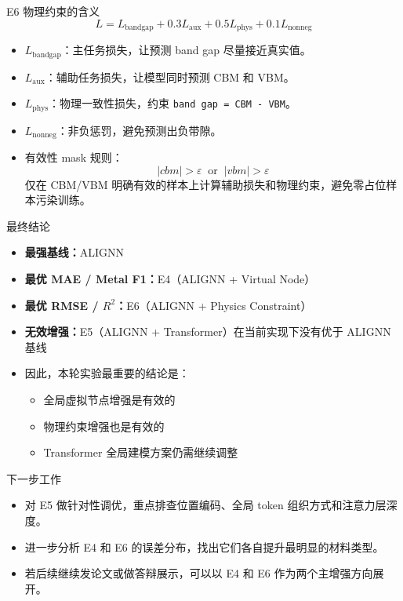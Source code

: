 \documentclass{beamer}
\begin{document}
\begin{frame}{E6 物理约束的含义}
\small
\[
L = L_{\text{bandgap}} + 0.3L_{\text{aux}} + 0.5L_{\text{phys}} + 0.1L_{\text{nonneg}}
\]
\begin{itemize}
  \item $L_{\text{bandgap}}$：主任务损失，让预测 band gap 尽量接近真实值。
  \item $L_{\text{aux}}$：辅助任务损失，让模型同时预测 CBM 和 VBM。
  \item $L_{\text{phys}}$：物理一致性损失，约束 \texttt{band gap = CBM - VBM}。
  \item $L_{\text{nonneg}}$：非负惩罚，避免预测出负带隙。
  \item 有效性 mask 规则：
  \[
  |cbm| > \varepsilon \;\; \text{or} \;\; |vbm| > \varepsilon
  \]
  仅在 CBM/VBM 明确有效的样本上计算辅助损失和物理约束，避免零占位样本污染训练。
\end{itemize}
\end{frame}

\begin{frame}{最终结论}
\begin{itemize}
  \item \textbf{最强基线：}ALIGNN
  \item \textbf{最优 MAE / Metal F1：}E4（ALIGNN + Virtual Node）
  \item \textbf{最优 RMSE / $R^2$：}E6（ALIGNN + Physics Constraint）
  \item \textbf{无效增强：}E5（ALIGNN + Transformer）在当前实现下没有优于 ALIGNN 基线
  \item 因此，本轮实验最重要的结论是：
  \begin{itemize}
    \item 全局虚拟节点增强是有效的
    \item 物理约束增强也是有效的
    \item Transformer 全局建模方案仍需继续调整
  \end{itemize}
\end{itemize}
\end{frame}

\begin{frame}{下一步工作}
\begin{itemize}
  \item 对 E5 做针对性调优，重点排查位置编码、全局 token 组织方式和注意力层深度。
  \item 进一步分析 E4 和 E6 的误差分布，找出它们各自提升最明显的材料类型。
  \item 若后续继续发论文或做答辩展示，可以以 E4 和 E6 作为两个主增强方向展开。
\end{itemize}
\end{frame}
\end{document}
